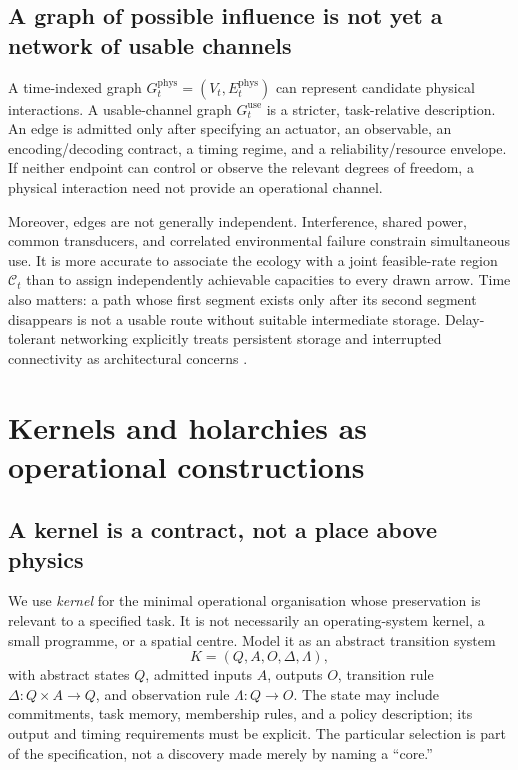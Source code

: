 \documentclass[11pt,a4paper]{article}
\theoremstyle{definition}
\theoremstyle{remark}
\newcommand{\calK}{K}
\begin{document}
\subsection{A graph of possible influence is not yet a network of usable channels}
A time-indexed graph $G_t^{\mathrm{phys}}=(V_t,E_t^{\mathrm{phys}})$ can represent candidate physical interactions. A usable-channel graph $G_t^{\mathrm{use}}$ is a stricter, task-relative description. An edge is admitted only after specifying an actuator, an observable, an encoding/decoding contract, a timing regime, and a reliability/resource envelope. If neither endpoint can control or observe the relevant degrees of freedom, a physical interaction need not provide an operational channel.

Moreover, edges are not generally independent. Interference, shared power, common transducers, and correlated environmental failure constrain simultaneous use. It is more accurate to associate the ecology with a joint feasible-rate region $\mathscr C_t$ than to assign independently achievable capacities to every drawn arrow. Time also matters: a path whose first segment exists only after its second segment disappears is not a usable route without suitable intermediate storage. Delay-tolerant networking explicitly treats persistent storage and interrupted connectivity as architectural concerns \citep{dtn}.

\section{Kernels and holarchies as operational constructions}\label{sec:kernel}
\subsection{A kernel is a contract, not a place above physics}
We use \emph{kernel} for the minimal operational organisation whose preservation is relevant to a specified task. It is not necessarily an operating-system kernel, a small programme, or a spatial centre. Model it as an abstract transition system
\begin{equation}\label{eq:kernel}
 \calK=(Q,A,O,\Delta,\Lambda),
\end{equation}
with abstract states $Q$, admitted inputs $A$, outputs $O$, transition rule $\Delta:Q\times A\to Q$, and observation rule $\Lambda:Q\to O$. The state may include commitments, task memory, membership rules, and a policy description; its output and timing requirements must be explicit. The particular selection is part of the specification, not a discovery made merely by naming a ``core.''
\end{document}
